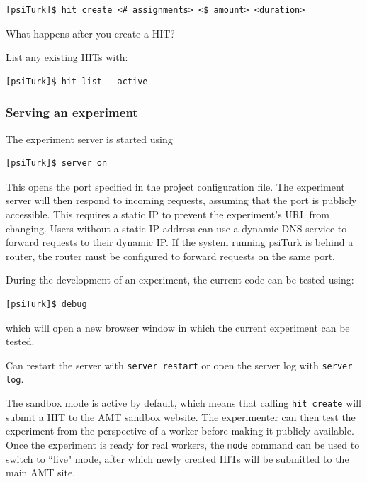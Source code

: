 \documentclass[twocolumn]{svjour3}          %
\begin{document}
\begin{lstlisting}
[psiTurk]$ hit create <# assignments> <$ amount> <duration>
\end{lstlisting}

What happens after you create a HIT?

List any existing HITs with:

\begin{lstlisting}
[psiTurk]$ hit list --active
\end{lstlisting}


\subsubsection{Serving an experiment}

The experiment server is started using

\begin{lstlisting}
[psiTurk]$ server on
\end{lstlisting}

\noindent This opens the port specified in the project configuration file.
The experiment server will then respond to incoming requests, assuming that the port is publicly accessible.
This requires a static IP to prevent the experiment's URL from changing.
Users without a static IP address can use a dynamic DNS service to forward requests to their dynamic IP.
If the system running psiTurk is behind a router, the router must be configured to forward requests on the same port.

During the development of an experiment, the current code can be tested using:

\begin{lstlisting}
[psiTurk]$ debug
\end{lstlisting}

\noindent which will open a new browser window in which the current experiment can be tested.

Can restart the server with \texttt{server restart} or open the server log with \texttt{server log}. 

The sandbox mode is active by default, which means that calling \texttt{hit create} will submit a HIT to the AMT sandbox website.
The experimenter can then test the experiment from the perspective of a worker before making it publicly available.
Once the experiment is ready for real workers, the \texttt{mode} command can be used to switch to ``live" mode, after which newly created HITs will be submitted to the main AMT site.
\end{document}

